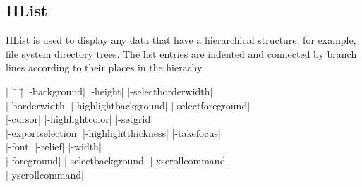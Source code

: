 \subsection*{HList}
HList is used to display any data that have
a hierarchical structure, for example, file system
directory trees. The list entries are indented and
connected by branch lines according to their places in the
hierachy.
\vskip5pt
\vspace{-4pt}
\begin{tabbing}
|                    |\=|                    |\= \kill                    
|-background|        \> |-height|             \> |-selectborderwidth| \\
|-borderwidth|       \> |-highlightbackground| \> |-selectforeground| \\
|-cursor|	     \> |-highlightcolor|     \> |-setgrid| \\         
|-exportselection|   \> |-highlightthickness| \> |-takefocus| \\
|-font|              \> |-relief|             \> |-width| \\           
|-foreground|        \> |-selectbackground|   \> |-xscrollcommand| \\  
\> \> |-yscrollcommand| \\  
\end{tabbing}

\vskip5pt

